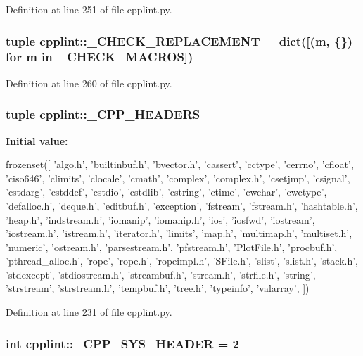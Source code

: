 Definition at line 251 of file cpplint.py.

\hypertarget{namespacecpplint_ad966b15edc61d0e0fa98cf4ce1a0135a}{
\subsubsection[{\_\-CHECK\_\-REPLACEMENT}]{\setlength{\rightskip}{0pt plus 5cm}tuple {\bf cpplint::\_\-CHECK\_\-REPLACEMENT} = dict(\mbox{[}(m, \{\}) for m in {\bf \_\-CHECK\_\-MACROS}\mbox{]})}}
\label{namespacecpplint_ad966b15edc61d0e0fa98cf4ce1a0135a}


Definition at line 260 of file cpplint.py.

\hypertarget{namespacecpplint_a8b16f3827d7722217dd3a2f50f24087d}{
\subsubsection[{\_\-CPP\_\-HEADERS}]{\setlength{\rightskip}{0pt plus 5cm}tuple {\bf cpplint::\_\-CPP\_\-HEADERS}}}
\label{namespacecpplint_a8b16f3827d7722217dd3a2f50f24087d}
{\bfseries Initial value:}
\begin{DoxyCode}
frozenset([
    'algo.h', 'builtinbuf.h', 'bvector.h', 'cassert', 'cctype',
    'cerrno', 'cfloat', 'ciso646', 'climits', 'clocale', 'cmath',
    'complex', 'complex.h', 'csetjmp', 'csignal', 'cstdarg', 'cstddef',
    'cstdio', 'cstdlib', 'cstring', 'ctime', 'cwchar', 'cwctype',
    'defalloc.h', 'deque.h', 'editbuf.h', 'exception', 'fstream',
    'fstream.h', 'hashtable.h', 'heap.h', 'indstream.h', 'iomanip',
    'iomanip.h', 'ios', 'iosfwd', 'iostream', 'iostream.h', 'istream.h',
    'iterator.h', 'limits', 'map.h', 'multimap.h', 'multiset.h',
    'numeric', 'ostream.h', 'parsestream.h', 'pfstream.h', 'PlotFile.h',
    'procbuf.h', 'pthread_alloc.h', 'rope', 'rope.h', 'ropeimpl.h',
    'SFile.h', 'slist', 'slist.h', 'stack.h', 'stdexcept',
    'stdiostream.h', 'streambuf.h', 'stream.h', 'strfile.h', 'string',
    'strstream', 'strstream.h', 'tempbuf.h', 'tree.h', 'typeinfo', 'valarray',
    ])
\end{DoxyCode}


Definition at line 231 of file cpplint.py.

\hypertarget{namespacecpplint_a89c3b71932122fc90afd2f47c07574f4}{
\subsubsection[{\_\-CPP\_\-SYS\_\-HEADER}]{\setlength{\rightskip}{0pt plus 5cm}int {\bf cpplint::\_\-CPP\_\-SYS\_\-HEADER} = 2}}
\label{namespacecpplint_a89c3b71932122fc90afd2f47c07574f4}


